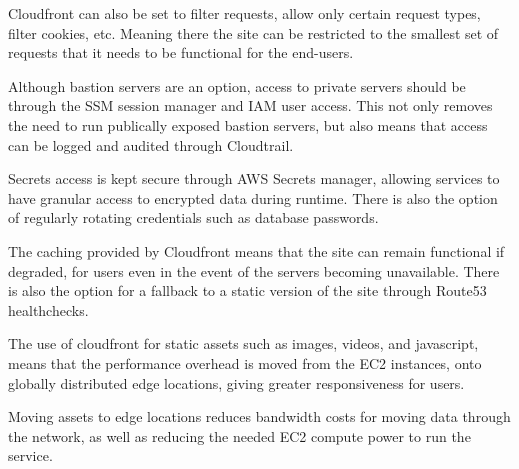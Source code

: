Cloudfront can also be set to filter requests, allow only certain request types, filter cookies, etc. Meaning there the site can be restricted to the smallest set of requests that it needs to be functional for the end-users.

Although bastion servers are an option, access to private servers should be through the SSM session manager and IAM user access. This not only removes the need to run publically exposed bastion servers, but also means that access can be logged and audited through Cloudtrail.

Secrets access is kept secure through AWS Secrets manager, allowing services to have granular access to encrypted data during runtime. There is also the option of regularly rotating credentials such as database passwords.



The caching provided by Cloudfront means that the site can remain functional if degraded, for users even in the event of the servers becoming unavailable. There is also the option for a fallback to a static version of the site through Route53 healthchecks.


The use of cloudfront for static assets such as images, videos, and javascript, means that the performance overhead is moved from the EC2 instances, onto globally distributed edge locations, giving greater responsiveness for users.



Moving assets to edge locations reduces bandwidth costs for moving data through the network, as well as reducing the needed EC2 compute power to run the service.

